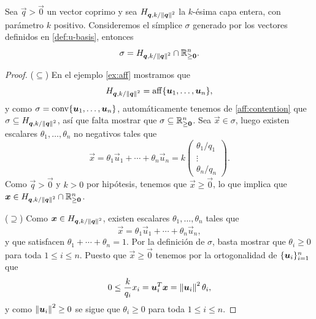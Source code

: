 \begin{lemma}
	\label{lemma:sigmachar1}
	Sea $\vec{q} > \vec{0}$ un vector coprimo y sea $H_{\boldsymbol{\boldsymbol{q}}, k/\left\lVert \boldsymbol{\boldsymbol{q}} \right\rVert^{2}}$ la
	$k$-ésima capa entera, con parámetro $k$ positivo. Consideremos el símplice $\sigma$ generado por
	los vectores definidos en \eqref{def:u-basis}, entonces
	\begin{equation*}
		\sigma = H_{\boldsymbol{\boldsymbol{q}}, k/\left\lVert \boldsymbol{\boldsymbol{q}} \right\rVert^{2}} \cap \mathbb{R}^n_{\geq \boldsymbol{0}}.
	\end{equation*}
\end{lemma}
\begin{proof}
	($\subseteq$) En el ejemplo \ref{ex:aff} mostramos que
	\begin{equation*}
		H_{\boldsymbol{\boldsymbol{q}}, k/\left\lVert \boldsymbol{\boldsymbol{q}} \right\rVert^{2}} = \operatorname{aff}\lbrace \boldsymbol{u}_1, \ldots, \boldsymbol{u}_n \rbrace,
	\end{equation*}
	y como $\sigma = \operatorname{conv}\lbrace \boldsymbol{u}_1, \ldots, \boldsymbol{u}_n \rbrace$, automáticamente tenemos de
	\eqref{aff:contention} que $\sigma \subseteq H_{\boldsymbol{\boldsymbol{q}}, k/\left\lVert \boldsymbol{\boldsymbol{q}} \right\rVert^{2}}$, así que falta mostrar que
	$\sigma \subseteq \mathbb{R}^n_{\geq \boldsymbol{0}}$. Sea $\vec{x} \in \sigma$, luego existen escalares
	$\theta_1, \ldots, \theta_n$ no negativos tales que
	\begin{equation*}
		\vec{x} = \theta_1\vec{u}_1 + \cdots + \theta_n\vec{u}_n
		= k\begin{pmatrix}
			\theta_1 / q_1 \\
			\vdots \\
			\theta_n / q_n
		\end{pmatrix}.
	\end{equation*}
	Como $\vec{q} > \vec{0}$ y $k > 0$ por hipótesis, tenemos que $\vec{x} \geq \vec{0}$, lo que
	implica que $\boldsymbol{x} \in H_{\boldsymbol{\boldsymbol{q}}, k/\left\lVert \boldsymbol{\boldsymbol{q}} \right\rVert^{2}} \cap \mathbb{R}^n_{\geq \boldsymbol{0}}$.

	($\supseteq$) Como $\boldsymbol{x} \in H_{\boldsymbol{\boldsymbol{q}}, k/\left\lVert \boldsymbol{\boldsymbol{q}} \right\rVert^{2}}$, existen escalares $\theta_1, \ldots,
	\theta_n$ tales que
	\begin{equation*}
		\vec{x} = \theta_1\vec{u}_1 + \cdots + \theta_n\vec{u}_n,
	\end{equation*}
	y que satisfacen $\theta_1 + \cdots + \theta_n = 1$. Por la definición de $\sigma$, basta
	mostrar que $\theta_i \geq 0$ para toda $1 \leq i \leq n$. Puesto que $\vec{x} \geq \vec{0}$
	tenemos por la ortogonalidad de $\lbrace \boldsymbol{u}_i \rbrace_{i=1}^{n}$ que
	\begin{equation*}
		0 \leq \frac{k}{q_i}x_i = \boldsymbol{u}_i^T\boldsymbol{x} = \left\lVert \boldsymbol{u}_i \right\rVert^2\theta_i,
	\end{equation*}
	y como $\left\lVert \boldsymbol{u}_i \right\rVert^2 \geq 0$ se sigue que $\theta_i \geq 0$ para toda $1 \leq i \leq n$.
\end{proof}


